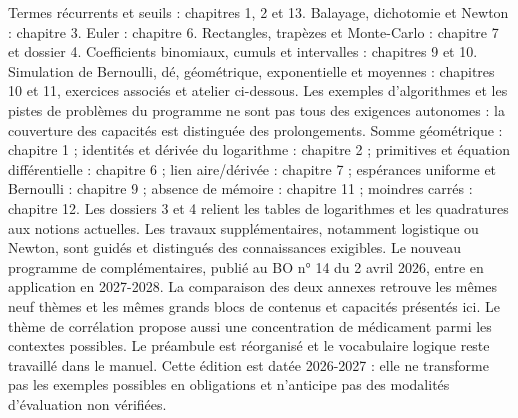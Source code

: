 
Termes récurrents et seuils : chapitres 1, 2 et 13. Balayage, dichotomie et Newton : chapitre 3.
Euler : chapitre 6. Rectangles, trapèzes et Monte-Carlo : chapitre 7 et dossier 4.
Coefficients binomiaux, cumuls et intervalles : chapitres 9 et 10. Simulation de Bernoulli, dé, géométrique, exponentielle et moyennes : chapitres 10 et 11, exercices associés et atelier ci-dessous.
Les exemples d'algorithmes et les pistes de problèmes du programme ne sont pas tous des exigences autonomes : la couverture des capacités est distinguée des prolongements.
Somme géométrique : chapitre 1 ; identités et dérivée du logarithme : chapitre 2 ; primitives et équation différentielle : chapitre 6 ; lien aire/dérivée : chapitre 7 ; espérances uniforme et Bernoulli : chapitre 9 ; absence de mémoire : chapitre 11 ; moindres carrés : chapitre 12.
Les dossiers 3 et 4 relient les tables de logarithmes et les quadratures aux notions actuelles. Les travaux supplémentaires, notamment logistique ou Newton, sont guidés et distingués des connaissances exigibles.
Le nouveau programme de complémentaires, publié au BO n° 14 du 2 avril 2026, entre en application en 2027-2028. La comparaison des deux annexes retrouve les mêmes neuf thèmes et les mêmes grands blocs de contenus et capacités présentés ici. Le thème de corrélation propose aussi une concentration de médicament parmi les contextes possibles. Le préambule est réorganisé et le vocabulaire logique reste travaillé dans le manuel.
Cette édition est datée 2026-2027 : elle ne transforme pas les exemples possibles en obligations et n'anticipe pas des modalités d'évaluation non vérifiées.
